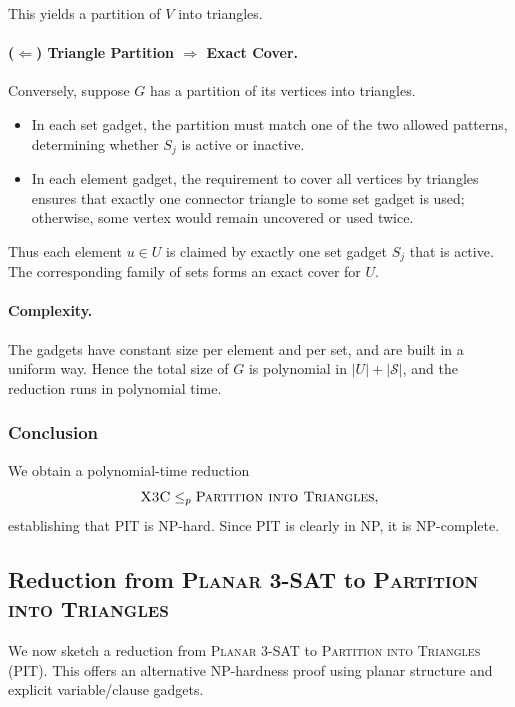 \documentclass[9pt]{extarticle}
\begin{document}
This yields a partition of $V$ into triangles.

\paragraph{($\Leftarrow$) Triangle Partition $\Rightarrow$ Exact Cover.}
Conversely, suppose $G$ has a partition of its vertices into triangles.

\begin{itemize}
    \item In each set gadget, the partition must match one of the two allowed
          patterns, determining whether $S_j$ is active or inactive.
    \item In each element gadget, the requirement to cover all vertices by
          triangles ensures that exactly one connector triangle to some set
          gadget is used; otherwise, some vertex would remain uncovered or used
          twice.
\end{itemize}

Thus each element $u \in U$ is claimed by exactly one set gadget $S_j$ that is
active.  The corresponding family of sets forms an exact cover for $U$.

\paragraph{Complexity.}
The gadgets have constant size per element and per set, and are built in a
uniform way.  Hence the total size of $G$ is polynomial in $|U| + |\mathcal{S}|$,
and the reduction runs in polynomial time.

\subsubsection*{Conclusion}
We obtain a polynomial-time reduction
\[
    \textsc{X3C} \le_p \textsc{Partition into Triangles},
\]
establishing that PIT is NP-hard.  Since PIT is clearly in NP, it is NP-complete.

\subsection{Reduction from \textsc{Planar 3-SAT} to \textsc{Partition into Triangles}}

We now sketch a reduction from \textsc{Planar 3-SAT} to \textsc{Partition into
Triangles} (PIT).  This offers an alternative NP-hardness proof using planar
structure and explicit variable/clause gadgets.
\end{document}
